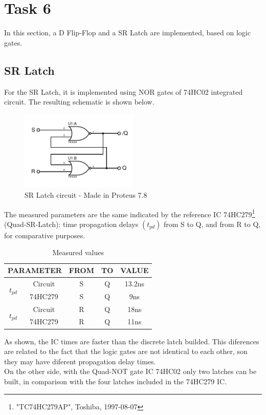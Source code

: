 
\newpage

\section*{Task 6}
In this section, a D Flip-Flop and a SR Latch
are implemented, based on logic gates.
\subsection*{SR Latch}
For the SR Latch, it is 
implemented using NOR gates of 74HC02 integrated
circuit. The resulting schematic is shown below.

\begin{figure}[H]
    \begin{centering}
    \includegraphics[width=0.5\textwidth]{data/latchSR}
    \par\end{centering}
    \caption{SR Latch circuit - Made in Proteus 7.8}
\end{figure}

The measured parameters are the same indicated
by the reference IC 74HC279\footnote{"TC74HC279AP", Toshiba, 1997-08-07} (Quad-SR-Latch): 
time propagation delays $(t_{pd})$ from S to Q, 
and from R to Q, for comparative purposes.

\begin{table}[H]
    \begin{center}
        \begin{tabular}{|c|c|c|c|c|}
            \hline 
            \multicolumn{2}{|c|}{PARAMETER} & FROM & TO & VALUE\tabularnewline
            \hline 
            \hline 
            \multirow{2}{*}{$t_{pd}$} & Circuit & S & Q & 13.2ns \tabularnewline
            \cline{2-5} 
             & 74HC279 & S & Q & 9ns\tabularnewline
            \hline 
            \multirow{2}{*}{$t_{pd}$} & Circuit & R & Q & 18ns \tabularnewline
            \cline{2-5} 
             & 74HC279 & R & Q & 11ns\tabularnewline
            \hline 
            \end{tabular}
    \caption{Measured values}
    \end{center}
\end{table}
As shown, the IC times are faster than the 
discrete latch builded. This diferences are 
related to the fact that the logic gates are 
not identical to each other, son they may have
diferent propagation delay times.\\
On the other side, with the Quad-NOT gate IC 74HC02 
only two latches can be built, in comparison with 
the four latches included in the 74HC279 IC.
\newpage
